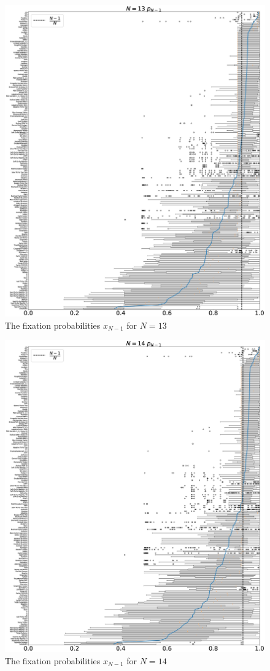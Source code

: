 \documentclass[10pt,letterpaper]{article}
\begin{document}
\begin{figure}[!hbtp]
    \centering
    \includegraphics[draft, width=\textwidth]{./Fig35.eps}
    \caption{The fixation probabilities \(x_{N-1}\) for \(N=13\)}
\end{figure}

\begin{figure}[!hbtp]
    \centering
    \includegraphics[draft, width=\textwidth]{./Fig36.eps}
    \caption{The fixation probabilities \(x_{N-1}\) for \(N=14\)}
    \label{resistance-14}
\end{figure}
\end{document}
